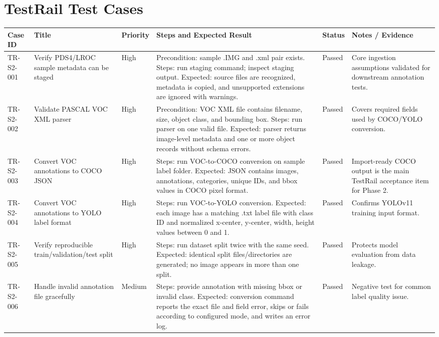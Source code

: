 \documentclass[11pt,landscape]{article}
\begin{document}
\section*{TestRail Test Cases}
\scriptsize
\begin{longtable}{p{0.75in}p{1.55in}p{0.65in}p{4.05in}p{0.65in}p{1.35in}}\toprule
\textbf{Case ID} & \textbf{Title} & \textbf{Priority} & \textbf{Steps and Expected Result} & \textbf{Status} & \textbf{Notes / Evidence}\\\midrule\endhead
TR-S2-001 & Verify PDS4/LROC sample metadata can be staged & High & Precondition: sample .IMG and .xml pair exists. Steps: run staging command; inspect staging output. Expected: source files are recognized, metadata is copied, and unsupported extensions are ignored with warnings. & Passed & Core ingestion assumptions validated for downstream annotation tests. \\
TR-S2-002 & Validate PASCAL VOC XML parser & High & Precondition: VOC XML file contains filename, size, object class, and bounding box. Steps: run parser on one valid file. Expected: parser returns image-level metadata and one or more object records without schema errors. & Passed & Covers required fields used by COCO/YOLO conversion. \\
TR-S2-003 & Convert VOC annotations to COCO JSON & High & Steps: run VOC-to-COCO conversion on sample label folder. Expected: JSON contains images, annotations, categories, unique IDs, and bbox values in COCO pixel format. & Passed & Import-ready COCO output is the main TestRail acceptance item for Phase 2. \\
TR-S2-004 & Convert VOC annotations to YOLO label format & High & Steps: run VOC-to-YOLO conversion. Expected: each image has a matching .txt label file with class ID and normalized x-center, y-center, width, height values between 0 and 1. & Passed & Confirms YOLOv11 training input format. \\
TR-S2-005 & Verify reproducible train/validation/test split & High & Steps: run dataset split twice with the same seed. Expected: identical split files/directories are generated; no image appears in more than one split. & Passed & Protects model evaluation from data leakage. \\
TR-S2-006 & Handle invalid annotation file gracefully & Medium & Steps: provide annotation with missing bbox or invalid class. Expected: conversion command reports the exact file and field error, skips or fails according to configured mode, and writes an error log. & Passed & Negative test for common label quality issue. \\

\end{longtable}
\end{document}
